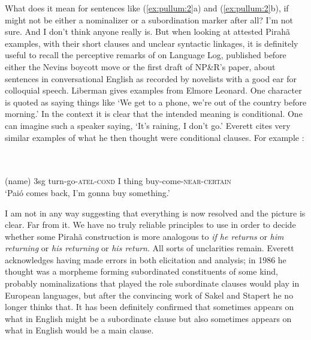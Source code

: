\documentclass[output=paper,colorlinks,citecolor=brown
]{langscibook}
\begin{document}
What does it mean for sentences like (\ref{ex:pullum:2}a) and (\ref{ex:pullum:2}b), if \mbox{}
might not be either a nominalizer or a subordination marker after all?
I'm not sure. And I don't think anyone really is. But when looking at
attested Pirah{\~a} examples, with their short clauses and unclear
syntactic linkages, it is definitely useful to recall the perceptive
remarks of \citet{Liberman06} on Language Log, published before either
the Nevins boycott move or the first draft of NP\&R's paper, about
sentences in conversational English as recorded by novelists with a
good ear for colloquial speech. Liberman gives examples from Elmore
Leonard. One character is quoted as saying things like `We get to a
phone, we're out of the country before morning.' In the context it
is clear that the intended meaning is conditional. One can imagine
such a speaker saying, `It's raining, I don't go.' Everett cites very
similar examples of what he then thought were conditional clauses.
For example \citep[265, ex.~(241)]{Everett86HAL}:

\ea
\label{ex:pullum:5}
 \\
\gll  {}  
               \\
      (name) 3sg turn-go-\textsc{atel}-\textsc{cond} I thing buy-come-\textsc{near}-\textsc{certain} \\
\glt `Pai\'o comes back, I'm gonna buy something.'
\z

I am not in any way suggesting that everything is now resolved and
the picture is clear. Far from it. We have no truly reliable principles
to use in order to decide whether some Pirah{\~a} construction is
more analogous to \textit{if he returns} or \textit{him returning}
or \textit{his returning} or \textit{his return}. All sorts of
unclarities remain. Everett acknowledges having made errors in both
elicitation and analysis; in 1986 he thought \mbox{} was
a morpheme forming subordinated constituents of some kind, probably
nominalizations that played the role subordinate clauses would play
in European languages, but after the convincing work of Sakel and
Stapert he no longer thinks that. It has been definitely confirmed
that \mbox{} sometimes appears on what in English might
be a subordinate clause but also sometimes appears on what in English
would be a main clause.
\end{document}
